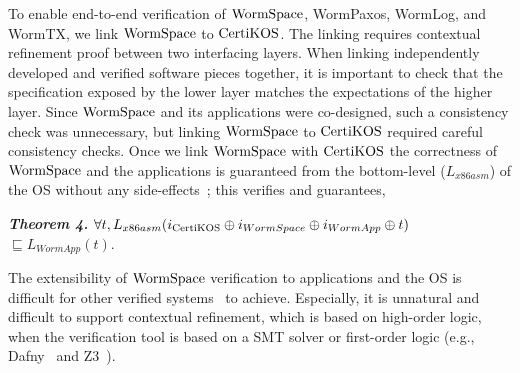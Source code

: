 To enable end-to-end verification of $\mathrm{WormSpace}$, WormPaxos, WormLog, and WormTX, we link $\mathrm{WormSpace}$ to $\mathrm{CertiKOS}$. The linking requires contextual refinement proof between two interfacing layers.
When linking independently developed and verified software pieces together, it is important to check that the specification exposed by the lower layer matches the expectations of the higher layer. Since $\mathrm{WormSpace}$ and its applications were co-designed, such a consistency check was unnecessary, but linking $\mathrm{WormSpace}$ to $\mathrm{CertiKOS}$ required careful consistency checks. Once we link $\mathrm{WormSpace}$ with $\mathrm{CertiKOS}$ the correctness of $\mathrm{WormSpace}$ and the applications is guaranteed from the bottom-level ($L_{x86asm}$) of the OS without any side-effects~\cite{shimlayer}; this verifies and guarantees,



\noindent\textit{\textbf{Theorem 4.} $\forall t, L_{x86asm} (i_{\certikos} \oplus i_{WormSpace} \oplus i_{WormApp} \oplus t) \\
\null$\qquad\qquad\quad\quad$ \sqsubseteq L_{WormApp} (t)$}. 
	
The extensibility of $\mathrm{WormSpace}$ verification to applications and the OS is difficult for other verified systems~\cite{ironfleet, hyperkernel} to achieve. Especially, it is unnatural and difficult to support contextual refinement, which is based on high-order logic, when the verification tool is based on a SMT solver or first-order logic (e.g., Dafny~\cite{dafny} and Z3~\cite{moura08}). 

